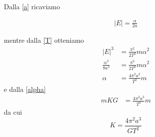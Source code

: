 \documentclass[a4paper,11pt]{article}
\begin{document}
Dalla \eqref{a} ricaviamo

\begin{align*}
	|E| = \frac{\alpha}{2 a}
\end{align*}

mentre dalla \eqref{T} otteniamo
\begin{align*}
	|E|^3 & = \frac{\pi^2}{2 T^2} m \alpha^2 \\
	\frac{\alpha^3}{8 a^3} & = \frac{\pi^2}{2 T^2} m \alpha^2\\
	\alpha & = \frac{4 \pi^2 a^3}{T^2} m
\end{align*}
e dalla \eqref{alpha}
\begin{align*}
	m K G & = \frac{4 \pi^2 a^3}{T^2} m
\end{align*}
da cui
\begin{equation}
\label{K} K = \frac{4 \pi^2 a^3}{G T^2}
\end{equation}
\end{document}
